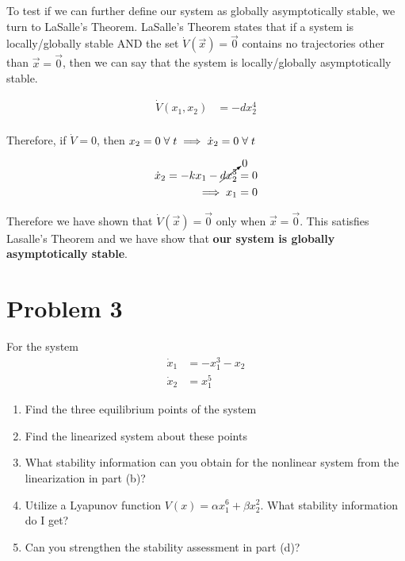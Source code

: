 \documentclass{article}
\begin{document}
  To test if we can further define our system as globally asymptotically stable,
  we turn to LaSalle's Theorem. LaSalle's Theorem states that if a system is
  locally/globally stable AND the set $\dot{V}(\vec{x})=\vec{0}$ contains no
  trajectories other than $\vec{x}=\vec{0}$, then we can say that the system is
  locally/globally asymptotically stable.

  \begin{align*}
    \dot{V}(x_1,x_2) &= -dx_2^4 \\
  \end{align*}

  Therefore, if $\dot{V}=0$, then $x_2=0 \hspace{1mm} \forall \hspace{1mm} t
  \implies \dot{x}_2=0 \hspace{1mm} \forall \hspace{1mm} t$

  \begin{align*}
    \dot{x}_2 = -kx_1 - \cancelto{0}{dx_2^3} = 0 \\
    \implies x_1 = 0
  \end{align*}

  Therefore we have shown that $\dot{V}(\vec{x})=\vec{0}$ only when
  $\vec{x}=\vec{0}$. This satisfies Lasalle's Theorem and we have show that
  \textbf{our system is globally asymptotically stable}.

  \newpage

  \section{Problem 3}

  For the system
  \begin{align*}
    \dot{x}_1 &= -x_1^3 - x_2 \\
    \dot{x}_2 &= x_1^5
  \end{align*}
  \begin{enumerate}[label=(\alph*)]
    \item Find the three equilibrium points of the system
    \item Find the linearized system about these points
    \item What stability information can you obtain for the nonlinear system
      from the linearization in part (b)?
    \item Utilize a Lyapunov function $V(x) = \alpha x_1^6 + \beta x_2^2$. What
        stability information do I get?
    \item Can you strengthen the stability assessment in part (d)?
  \end{enumerate}
\end{document}
